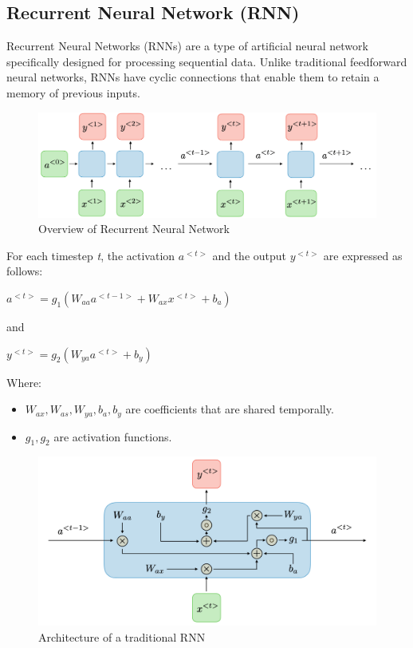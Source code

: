 \documentclass{ieeeojies}
\begin{document}
\subsection{Recurrent Neural Network (RNN)}
Recurrent Neural Networks \cite{b10} (RNNs) are a type of artificial neural network specifically designed for processing sequential data. Unlike traditional feedforward neural networks, RNNs have cyclic connections that enable them to retain a memory of previous inputs.
\begin{figure}[H]
	\centering
	\begin{minipage}{0.32\textwidth}
		\centering
		\includegraphics[width=1\textwidth]{bibliography/Images/RNN_Img1.png}
		\caption{Overview of Recurrent Neural Network}
		\label{fig:1}
	\end{minipage}
\end{figure}
For each timestep \textit{t}, the activation $a^{<t>}$ and the output $y^{<t>}$ are expressed as follows:
\newline \centerline{$a^{<t>} = g_{1}(W_{aa}a^{<t-1>} + W_{ax}x^{<t>} + b_{a})$}
\newline and
\newline \centerline{$y^{<t>} = g_{2}(W_{ya}a^{<t>} +b_{y})$}
\newline Where:
\begin{itemize}
	\item $W_{ax}, W_{as}, W_{ya}, b_{a}, b_{y}$ are coefficients that are shared temporally.
	\item $g_{1}, g_{2}$ are activation functions.
\end{itemize}
\begin{figure}[H]
	\centering
	\begin{minipage}{0.32\textwidth}
		\centering
		\includegraphics[width=1\textwidth]{bibliography/Images/RNN_Img2.png}
		\caption{Architecture of a traditional RNN}
		\label{fig:1}
	\end{minipage}
\end{figure}
\end{document}
